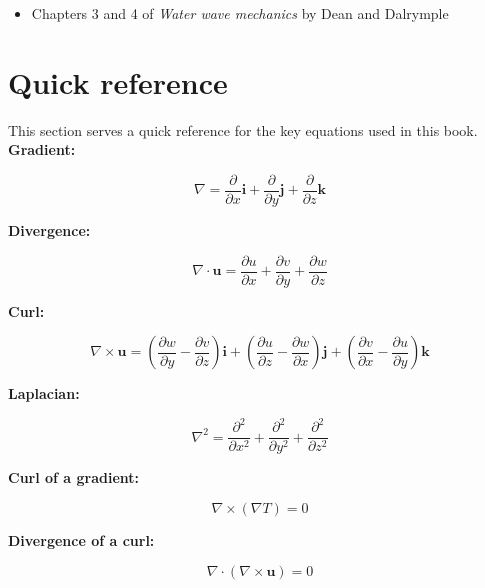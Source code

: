 \documentclass[12pt]{article}
\numberwithin{equation}{section}
\numberwithin{figure}{section}
\numberwithin{table}{section}
\begin{document}
\begin{itemize}
  \item Chapters 3 and 4 of \textit{Water wave mechanics} by Dean and Dalrymple
\end{itemize}

\newpage
\appendix

\section{Quick reference}

This section serves a quick reference for the key equations used in this book.\\

\textbf{Gradient:}

\begin{equation}
  \nabla = \frac{\partial}{\partial x} \mathbf{i} + \frac{\partial}{\partial y} \mathbf{j} + \frac{\partial}{\partial z} \mathbf{k}
\end{equation}

\textbf{Divergence:}

\begin{equation}
  \nabla \cdot \mathbf{u} = \frac{\partial u}{\partial x} + \frac{\partial v}{\partial y} + \frac{\partial w}{\partial z}
\end{equation}

\textbf{Curl:}

\begin{equation}
  \nabla \times \mathbf{u} = \left( \frac{\partial w}{\partial y} - \frac{\partial v}{\partial z} \right) \mathbf{i} + \left( \frac{\partial u}{\partial z} - \frac{\partial w}{\partial x} \right) \mathbf{j} + \left( \frac{\partial v}{\partial x} - \frac{\partial u}{\partial y} \right) \mathbf{k}
\end{equation}

\textbf{Laplacian:}

\begin{equation}
  \nabla^2 = \frac{\partial^2}{\partial x^2} + \frac{\partial^2}{\partial y^2} + \frac{\partial^2}{\partial z^2}
\end{equation}

\textbf{Curl of a gradient:}

\begin{equation}
  \nabla \times (\nabla T) = 0
\end{equation}

\textbf{Divergence of a curl:}

\begin{equation}
  \nabla \cdot (\nabla \times \mathbf{u}) = 0
\end{equation}
\end{document}
